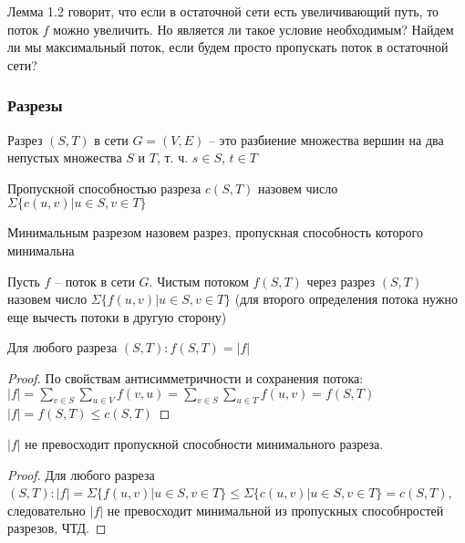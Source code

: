 \noindent Лемма 1.2 говорит, что если в остаточной сети есть увеличивающий путь, то поток $f$ можно увеличить. Но является ли такое условие необходимым? Найдем ли мы максимальный поток, если будем просто пропускать поток в остаточной сети?

\subsubsection{Разрезы}

\begin{definition}
    Разрез $(S, T)$ в сети $G = (V, E)$ -- это разбиение множества вершин на два непустых множества $S$ и $T$, т. ч. $s \in S$, $t \in T$
\end{definition}
\begin{definition}
    Пропускной способностью разреза $c(S, T)$ назовем число $\Sigma \{c(u, v) | u \in S, v \in T\}$
\end{definition}
\begin{definition}
    Минимальным разрезом назовем разрез, пропускная способность которого минимальна
\end{definition}
\begin{definition}
    Пусть $f$ -- поток в сети $G$. Чистым потоком $f(S, T)$ через разрез $(S, T)$ назовем число $\Sigma \{f(u, v) | u \in S, v \in T\}$ (для второго определения потока нужно еще вычесть потоки в другую сторону)
\end{definition}

\begin{lemma}
    Для любого разреза $(S, T): f(S, T) = |f|$
\end{lemma}
\begin{proof}
    По свойствам антисимметричности и сохранения потока: \\
    $|f| = \sum_{v \in S} \sum_{u \in V} f(v, u) = \sum_{v \in S} \sum_{u \in T} f(u, v) = f(S, T)$ \\
    $|f| = f(S, T) \leq c(S, T)$
\end{proof}

\begin{lemma}
    $|f|$ не превосходит пропускной способности минимального разреза.
\end{lemma}
\begin{proof}
    Для любого разреза $(S, T): |f| = \Sigma \{ f(u, v) | u \in S, v \in T\} \leq \Sigma \{c(u, v) | u \in S, v \in T\} = c(S, T)$, следовательно $|f|$ не превосходит минимальной из пропускных способнростей разрезов, ЧТД.
\end{proof}

